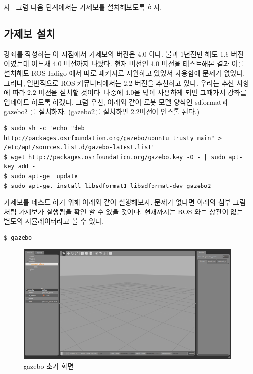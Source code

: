\noindent
자~ 그럼 다음 단계에서는 가제보를 설치해보도록 하자.

\subsection{가제보 설치}

강좌를 작성하는 이 시점에서 가제보의 버전은 4.0 이다. 불과 1년전만 해도 1.9 버전 이였는데 어느새 4.0 버전까지 나왔다. 현재 버전인 4.0 버전을 테스트해본 결과 이를 설치해도 ROS Indigo 에서 따로 패키지로 지원하고 있었서 사용함에 문제가 없었다. 그러나, 일반적으로 ROS 커뮤니티에서는 2.2 버전을 추천하고 있다. 우리는 추천 사항에 따라 2.2 버전을 설치할 것이다. 나중에 4.0을 많이 사용하게 되면 그때가서 강좌를 업데이트 하도록 하겠다. 그럼 우선, 아래와 같이 로봇 모델 양식인 sdformat과 gazebo2 를 설치하자. (gazebo2를 설치하면 2.2버전이 인스톨 된다.)

\vspace{\baselineskip}
\begin{lstlisting}[language=ROS]
$ sudo sh -c 'echo "deb http://packages.osrfoundation.org/gazebo/ubuntu trusty main" > /etc/apt/sources.list.d/gazebo-latest.list'
$ wget http://packages.osrfoundation.org/gazebo.key -O - | sudo apt-key add -
$ sudo apt-get update
$ sudo apt-get install libsdformat1 libsdformat-dev gazebo2 
\end{lstlisting}

가제보를 테스트 하기 위해 아래와 같이 실행해보자. 문제가 없다면 아래의 첨부 그림처럼 가제보가 실행됨을 확인 할 수 있을 것이다. 현재까지는 ROS 와는 상관이 없는 별도의 시뮬레이터라고 볼 수 있다.

\vspace{\baselineskip}
\begin{lstlisting}[language=ROS]
$ gazebo
\end{lstlisting}

\begin{figure}[h]
\centering\includegraphics[width=0.9\columnwidth]{pictures/chapter10/gazebo3d.png}
\caption{gazebo 초기 화면}
\end{figure}

